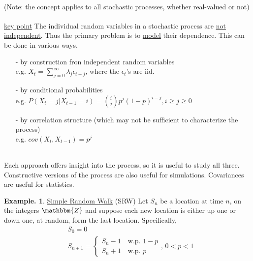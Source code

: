 \documentclass[12pt]{article}
\theoremstyle{definition}
\newtheorem{myexp}{Example.}[section]
\theoremstyle{plain}
\begin{document}
$\mbox{}$\\
(Note: the concept applies to all stochastic processes, whether real-valued or not)\\ \\
\underline{key point} The individual random variables in a stochastic process are \underline{not independent}. Thus the primary problem is to \underline{model} their dependence. This can be done in various ways.
\begin{itemize}
\item[-]  by construction fron independent random variables\\
e.g. $X_t = \sum_{j=0}^\infty \lambda_j \epsilon_{t-j}$, where the $\epsilon_t$'s are iid.
\item[-] by conditional probabilities\\
e.g. $P(X_t = j | X_{t-1} = i) = {i \choose j}p^j (1-p)^{i-j}, i \geq j \geq 0$ 
\item[-] by correlation structure (which may not be sufficient to characterize the process) \\
e.g. $cov(X_t, X_{t-1})=p^j$
\end{itemize}
$\mbox{}$\\
Each approach offers insight into the process, so it is useful to study all three. Constructive versions of the process are also useful for simulations. Covariances are useful for statistics.
\begin{myexp}
\underline{Simple Random Walk} (SRW)
Let $S_n$ be a location at time $n$, on the integers $\mathbbm{Z}$ and suppose each new location is either up one or down one, at random, form the last location. Specifically,\begin{displaymath}\begin{aligned}&S_0 = 0 \\ &S_{n+1} = \begin{cases}S_n - 1 \quad \mbox{w.p. $1-p$}\\S_n + 1 \quad \mbox{w.p. $p$}\end{cases} \mbox{, $0 < p <1$}\end{aligned} \end{displaymath}
\end{myexp}

\end{document}
